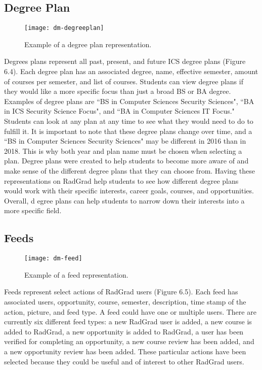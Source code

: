 \subsection{Degree Plan}
\begin{figure}[h]
\centering
\texttt{[image: dm-degreeplan]}
\caption{Example of a degree plan representation.}
\end{figure}
Degrees plans represent all past, present, and future ICS degree plans (Figure 6.4). Each degree plan has an associated degree, name, effective semester, amount of courses per semester, and list of courses. Students can view degree plans if they would like a more specific focus than just a broad BS or BA degree. Examples of degree plans are ``BS in Computer Sciences Security Sciences", ``BA in ICS Security Science Focus", and ``BA in Computer Sciences IT Focus." Students can look at any plan at any time to see what they would need to do to fulfill it. It is important to note that these degree plans change over time, and a ``BS in Computer Sciences Security Sciences" may be different in 2016 than in 2018. This is why both year and plan name must be chosen when selecting a plan.  Degree plans were created to help students to become more aware of and make sense of the different degree plans that they can choose from. Having these representations on RadGrad help students to see how different degree plans would work with their specific interests, career goals, courses, and opportunities. Overall, d
egree plans can help students to narrow down their interests into a more specific field. 

\subsection{Feeds}
\begin{figure}[h]
\centering
\texttt{[image: dm-feed]}
\caption{Example of a feed representation.}
\end{figure}
Feeds represent select actions of RadGrad users (Figure 6.5). Each feed has associated users, opportunity, course, semester, description, time stamp of the action, picture, and feed type. A feed could have one or multiple users. There are currently six different feed types: a new RadGrad user is added, a new course is added to RadGrad, a new opportunity is added to RadGrad, a user has been verified for completing an opportunity, a new course review has been added, and a new opportunity review has been added. These particular actions have been selected because they could be useful and of interest to other RadGrad users.

